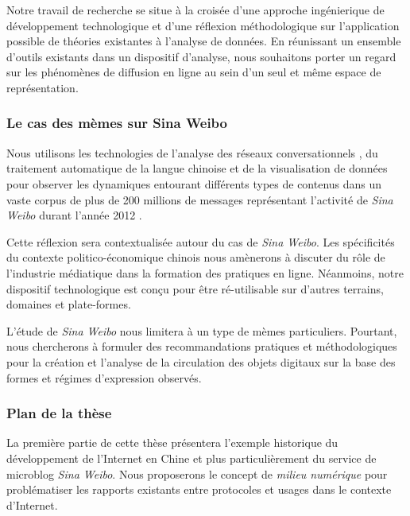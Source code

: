 Notre travail de recherche se situe à la croisée d'une approche ingénierique de développement technologique et d'une réflexion méthodologique sur l'application possible de théories existantes à l'analyse de données. En réunissant un ensemble d'outils existants dans un dispositif d'analyse, nous souhaitons porter un regard sur les phénomènes de diffusion en ligne au sein d'un seul et même espace de représentation.

\subsubsection{Le cas des mèmes sur Sina Weibo}

Nous utilisons les technologies de l'analyse des réseaux conversationnels \citep{Weng2012}, du traitement automatique de la langue chinoise \citep{Xue2003} et de la visualisation de données \citep{Cairo2012} pour observer les dynamiques entourant différents types de contenus dans un vaste corpus de plus de 200 millions de messages représentant l'activité de \textit{Sina Weibo} durant l'année 2012 \citep{Fu2013}. 

Cette réflexion sera contextualisée autour du cas de \textit{Sina Weibo}. Les spécificités du contexte politico-économique chinois nous amènerons à discuter du rôle de l'industrie médiatique dans la formation des pratiques en ligne. Néanmoins, notre dispositif technologique est conçu pour être ré-utilisable sur d'autres terrains, domaines et plate-formes. 

L'étude de \textit{Sina Weibo} nous limitera à un type de mèmes particuliers. Pourtant, nous chercherons à formuler des recommandations pratiques et méthodologiques pour la création et l'analyse de la circulation des objets digitaux sur la base des formes et régimes d'expression observés.  

\subsubsection{Plan de la thèse}


La première partie de cette thèse présentera l'exemple historique du développement de l'Internet en Chine et plus particulièrement du service de microblog \textit{Sina Weibo}. Nous proposerons le concept de \textit{milieu numérique} pour problématiser les rapports existants entre protocoles et usages dans le contexte d'Internet.


